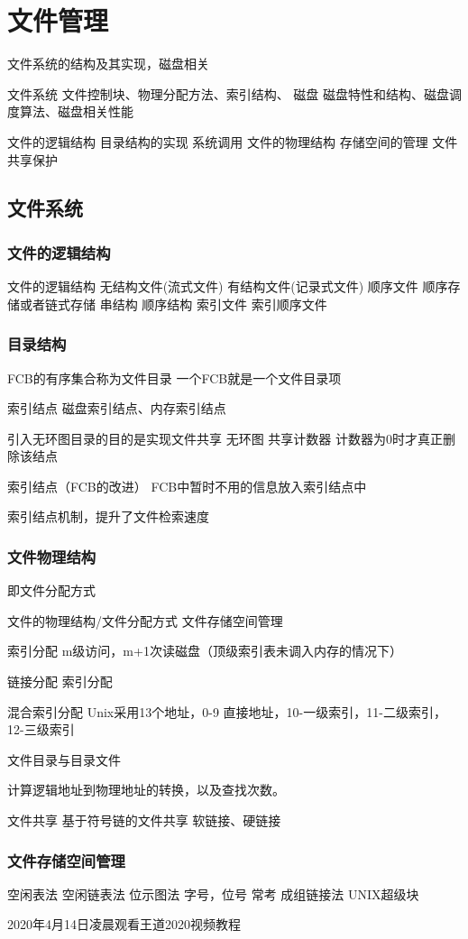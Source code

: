 \chapter{文件管理}

文件系统的结构及其实现，磁盘相关

文件系统
文件控制块、物理分配方法、索引结构、
磁盘
磁盘特性和结构、磁盘调度算法、磁盘相关性能

文件的逻辑结构
目录结构的实现
系统调用
文件的物理结构
存储空间的管理
文件共享保护

\section{文件系统}

\subsection{文件的逻辑结构}
文件的逻辑结构
	无结构文件(流式文件) 
	有结构文件(记录式文件) 
		顺序文件
			顺序存储或者链式存储
			串结构 顺序结构 
		索引文件
		索引顺序文件

\subsection{目录结构}
FCB的有序集合称为文件目录
一个FCB就是一个文件目录项

索引结点
磁盘索引结点、内存索引结点

引入无环图目录的目的是实现文件共享
无环图 共享计数器 计数器为0时才真正删除该结点


索引结点（FCB的改进）
FCB中暂时不用的信息放入索引结点中

索引结点机制，提升了文件检索速度


\subsection{文件物理结构}
即文件分配方式

文件的物理结构/文件分配方式
文件存储空间管理

索引分配
m级访问，m+1次读磁盘（顶级索引表未调入内存的情况下）

链接分配
索引分配

混合索引分配
Unix采用13个地址，0-9 直接地址，10-一级索引，11-二级索引，12-三级索引 

文件目录与目录文件

计算逻辑地址到物理地址的转换，以及查找次数。

文件共享
基于符号链的文件共享
软链接、硬链接


\subsection{文件存储空间管理}

空闲表法
空闲链表法
位示图法 字号，位号  常考 
成组链接法 UNIX超级块 








2020年4月14日凌晨观看王道2020视频教程
